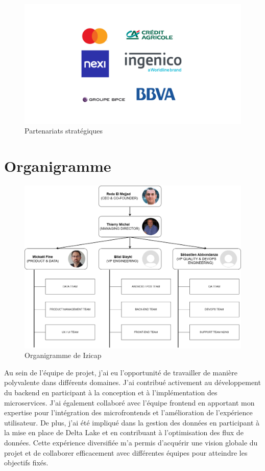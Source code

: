\begin{figure}[H]
\centering
\includegraphics[width=\linewidth]{images/partenaires.png}
\caption{Partenariats stratégiques}\label{fig:partenaires}
\end{figure}    
\section{Organigramme}
\begin{figure}[H]
\centering
\includegraphics[width=0.75\linewidth]{images/organigram.png}
\caption{Organigramme de Izicap}\label{fig:organigmramme}
\end{figure}

Au sein de l'équipe de projet, j'ai eu l'opportunité de travailler de manière polyvalente dans différents domaines. J'ai contribué activement au développement du backend en participant à la conception et à l'implémentation des microservices. J'ai également collaboré avec l'équipe frontend en apportant mon expertise pour l'intégration des microfrontends et l'amélioration de l'expérience utilisateur. De plus, j'ai été impliqué dans la gestion des données en participant à la mise en place de Delta Lake et en contribuant à l'optimisation des flux de données. Cette expérience diversifiée m'a permis d'acquérir une vision globale du projet et de collaborer efficacement avec différentes équipes pour atteindre les objectifs fixés.

